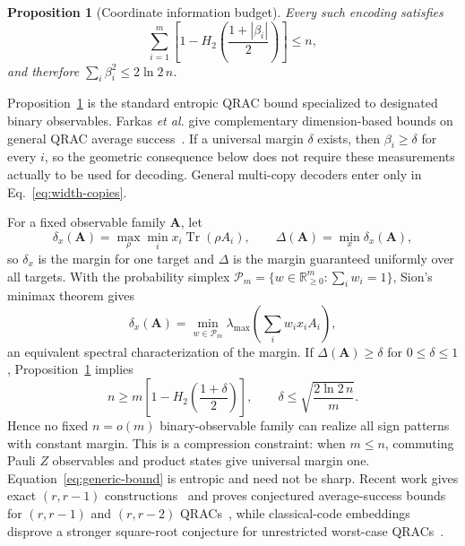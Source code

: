 \documentclass[10pt,aps,pra,twocolumn,superscriptaddress,nofootinbib,longbibliography]{revtex4-2}
\newtheorem{proposition}{Proposition}
\newcommand{\Tr}{\operatorname{Tr}}
\newcommand{\R}{\mathbb{R}}
\begin{document}
\begin{proposition}[Coordinate information budget]
\label{thm:bias-budget}
Every such encoding satisfies
\begin{equation}
    \sum_{i=1}^{m}\left[1-H_2\!\left(\frac{1+|\beta_i|}{2}\right)\right]\le n,
    \label{eq:bias-budget}
\end{equation}
and therefore $\sum_i\beta_i^2\le2\ln2\,n$.
\end{proposition}

Proposition~\ref{thm:bias-budget} is the standard entropic QRAC bound specialized to designated binary observables.  Farkas \emph{et al.} give complementary dimension-based bounds on general QRAC average success~\cite{Farkas2025QRACBounds}.  If a universal margin $\delta$ exists, then $\beta_i\ge\delta$ for every $i$, so the geometric consequence below does not require these measurements actually to be used for decoding.  General multi-copy decoders enter only in Eq.~\eqref{eq:width-copies}.

For a fixed observable family $\mathbf A$, let
\begin{equation}
    \delta_x(\mathbf A)=\max_\rho\min_i x_i\Tr(\rho A_i),
    \qquad
    \Delta(\mathbf A)=\min_x\delta_x(\mathbf A),
    \label{eq:generic-margin}
\end{equation}
so $\delta_x$ is the margin for one target and $\Delta$ is the margin guaranteed uniformly over all targets.  With the probability simplex $\mathcal P_m=\{w\in\R_{\ge0}^m:\sum_i w_i=1\}$, Sion's minimax theorem gives~\cite{Sion1958Minimax}
\begin{equation}
    \delta_x(\mathbf A)=\min_{w\in\mathcal P_m}\lambda_{\max}\!\left(\sum_i w_i x_iA_i\right),
    \label{eq:minimax-main}
\end{equation}
an equivalent spectral characterization of the margin.  If $\Delta(\mathbf A)\ge\delta$ for $0\le\delta\le1$, Proposition~\ref{thm:bias-budget} implies
\begin{equation}
    n\ge m\left[1-H_2\!\left(\frac{1+\delta}{2}\right)\right],
    \qquad
    \delta\le\sqrt{\frac{2\ln2\,n}{m}}.
    \label{eq:generic-bound}
\end{equation}
Hence no fixed $n=o(m)$ binary-observable family can realize all sign patterns with constant margin.  This is a compression constraint: when $m\le n$, commuting Pauli $Z$ observables and product states give universal margin one.  Equation~\eqref{eq:generic-bound} is entropic and need not be sharp.  Recent work gives exact $(r,r-1)$ constructions~\cite{Suzuki2026QRAC} and proves conjectured average-success bounds for $(r,r-1)$ and $(r,r-2)$ QRACs~\cite{TanJafar2026QRAC}, while classical-code embeddings disprove a stronger square-root conjecture for unrestricted worst-case QRACs~\cite{Liu2026QRAC}.
\end{document}
